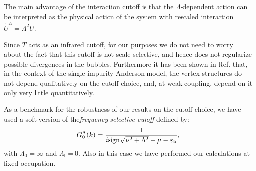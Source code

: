 The main advantage of the interaction cutoff is that  the $\Lambda$-dependent action can be interpreted\cite{Honerkamp2004} as the physical action of the system with rescaled interaction $\tilde{U}^\Lambda = \Lambda^2 U$.

Since $T$ acts as an infrared cutoff, for our purposes we do not need to worry about the fact that this cutoff is not scale-selective, and hence does not regularize possible divergences in the bubbles. 
Furthermore it has been shown in Ref.  that, in the context of the single-impurity Anderson model, the vertex-structures do not depend qualitatively on the cutoff-choice, and, at weak-coupling, depend on it only very little quantitatively. 

As a benchmark for the robustness of our results on the cutoff-choice, we have used a soft version of the\textit{frequency selective cutoff} defined\cite{Eberlein2014} by:
\begin{equation}
G_0^\Lambda(k) = \frac{1}{i\mathrm{sign}\sqrt{\nu^2+\Lambda^2 }-\mu- \varepsilon_{\mathbf{k}}},  
\end{equation}  
with $\Lambda_0=\infty$ and $\Lambda_{\mathrm{f}}=0$. Also in this case we have performed our calculations at fixed occupation. 


   
